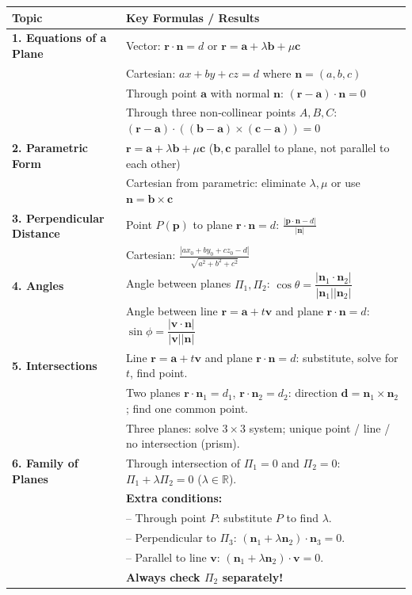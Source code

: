 \documentclass[11pt]{article}
\begin{document}
\begin{center}
\begin{tabularx}{\linewidth}{|l|X|}\hline
\rowcolor{popblueL}
\textbf{Topic} & \textbf{Key Formulas / Results} \\ \hline
\textbf{1. Equations of a Plane} &
Vector: $\mathbf{r}\cdot\mathbf{n}=d$ or $\mathbf{r}=\mathbf{a}+\lambda\mathbf{b}+\mu\mathbf{c}$ \\
& Cartesian: $ax+by+cz=d$ where $\mathbf{n}=(a,b,c)$ \\
& Through point $\mathbf{a}$ with normal $\mathbf{n}$: $(\mathbf{r}-\mathbf{a})\cdot\mathbf{n}=0$ \\
& Through three non‑collinear points $A,B,C$: $(\mathbf{r}-\mathbf{a})\cdot((\mathbf{b}-\mathbf{a})\times(\mathbf{c}-\mathbf{a}))=0$ \\ \hline
\textbf{2. Parametric Form} &
$\mathbf{r}=\mathbf{a}+\lambda\mathbf{b}+\mu\mathbf{c}$ ($\mathbf{b},\mathbf{c}$ parallel to plane, not parallel to each other) \\
& Cartesian from parametric: eliminate $\lambda,\mu$ or use $\mathbf{n}=\mathbf{b}\times\mathbf{c}$ \\ \hline
\textbf{3. Perpendicular Distance} &
Point $P(\mathbf{p})$ to plane $\mathbf{r}\cdot\mathbf{n}=d$: $\displaystyle \frac{|\mathbf{p}\cdot\mathbf{n}-d|}{|\mathbf{n}|}$ \\
& Cartesian: $\displaystyle \frac{|ax_0+by_0+cz_0-d|}{\sqrt{a^2+b^2+c^2}}$ \\ \hline
\textbf{4. Angles} &
Angle between planes $\Pi_1,\Pi_2$: $\cos\theta=\dfrac{|\mathbf{n}_1\cdot\mathbf{n}_2|}{|\mathbf{n}_1||\mathbf{n}_2|}$ \\
& Angle between line $\mathbf{r}=\mathbf{a}+t\mathbf{v}$ and plane $\mathbf{r}\cdot\mathbf{n}=d$: $\sin\phi=\dfrac{|\mathbf{v}\cdot\mathbf{n}|}{|\mathbf{v}||\mathbf{n}|}$ \\ \hline
\textbf{5. Intersections} &
Line $\mathbf{r}=\mathbf{a}+t\mathbf{v}$ and plane $\mathbf{r}\cdot\mathbf{n}=d$: substitute, solve for $t$, find point. \\
& Two planes $\mathbf{r}\cdot\mathbf{n}_1=d_1$, $\mathbf{r}\cdot\mathbf{n}_2=d_2$: direction $\mathbf{d}=\mathbf{n}_1\times\mathbf{n}_2$; find one common point. \\
& Three planes: solve $3\times3$ system; unique point / line / no intersection (prism). \\ \hline
\textbf{6. Family of Planes} &
Through intersection of $\Pi_1=0$ and $\Pi_2=0$: $\Pi_1+\lambda\Pi_2=0$ ($\lambda\in\mathbb{R}$). \\
& \textbf{Extra conditions:} \\
& \quad – Through point $P$: substitute $P$ to find $\lambda$. \\
& \quad – Perpendicular to $\Pi_3$: $(\mathbf{n}_1+\lambda\mathbf{n}_2)\cdot\mathbf{n}_3=0$. \\
& \quad – Parallel to line $\mathbf{v}$: $(\mathbf{n}_1+\lambda\mathbf{n}_2)\cdot\mathbf{v}=0$. \\
& \textbf{Always check $\Pi_2$ separately!} \\ \hline
\end{tabularx}
\end{center}
\end{document}
